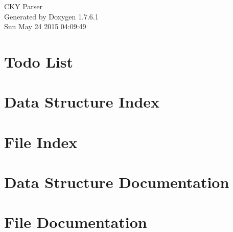 \documentclass[a4paper]{book}
\begin{document}
\hypersetup{pageanchor=false,citecolor=blue}
\begin{titlepage}
\vspace*{7cm}
\begin{center}
{\Large \-C\-K\-Y \-Parser }\\
\vspace*{1cm}
{\large \-Generated by Doxygen 1.7.6.1}\\
\vspace*{0.5cm}
{\small Sun May 24 2015 04:09:49}\\
\end{center}
\end{titlepage}
\clearemptydoublepage
{}
\tableofcontents
\clearemptydoublepage
{}
\hypersetup{pageanchor=true,citecolor=blue}
\chapter{\-Todo \-List}
\label{todo}
\hypertarget{todo}{}

\chapter{\-Data \-Structure \-Index}

\chapter{\-File \-Index}

\chapter{\-Data \-Structure \-Documentation}








\chapter{\-File \-Documentation}

















\printindex
\end{document}
